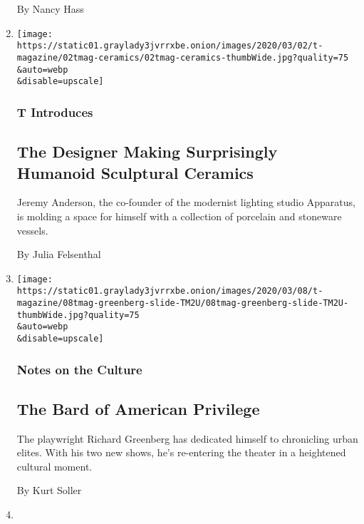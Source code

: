 \begin{enumerate}
  By Nancy Hass
\item
  \href{/2020/03/03/t-magazine/jeremy-anderson-ceramics.html}{}

  \texttt{[image: https://static01.graylady3jvrrxbe.onion/images/2020/03/02/t-magazine/02tmag-ceramics/02tmag-ceramics-thumbWide.jpg?quality=75\\\&auto=webp\\\&disable=upscale]}

  \hypertarget{t-introduces}{%
  \subsubsection{T Introduces}\label{t-introduces}}

  \hypertarget{the-designer-making-surprisingly-humanoid-sculptural-ceramics}{%
  \subsection{The Designer Making Surprisingly Humanoid Sculptural
  Ceramics}\label{the-designer-making-surprisingly-humanoid-sculptural-ceramics}}

  Jeremy Anderson, the co-founder of the modernist lighting studio
  Apparatus, is molding a space for himself with a collection of
  porcelain and stoneware vessels.

  By Julia Felsenthal
\item
  \href{/2020/03/03/t-magazine/richard-greenberg-playwright.html}{}

  \texttt{[image: https://static01.graylady3jvrrxbe.onion/images/2020/03/08/t-magazine/08tmag-greenberg-slide-TM2U/08tmag-greenberg-slide-TM2U-thumbWide.jpg?quality=75\\\&auto=webp\\\&disable=upscale]}

  \hypertarget{notes-on-the-culture-2}{%
  \subsubsection{Notes on the Culture}\label{notes-on-the-culture-2}}

  \hypertarget{the-bard-of-american-privilege}{%
  \subsection{The Bard of American
  Privilege}\label{the-bard-of-american-privilege}}

  The playwright Richard Greenberg has dedicated himself to chronicling
  urban elites. With his two new shows, he's re-entering the theater in
  a heightened cultural moment.

  By Kurt Soller
\item
  \href{/2020/03/02/t-magazine/brasserie-rosie-paris.html}{}


\end{enumerate}
